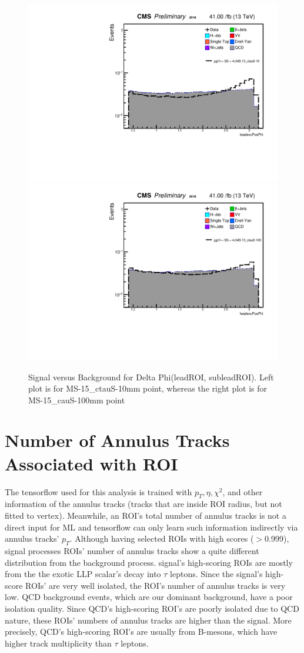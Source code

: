  \begin{figure}[h!]
   \caption{Signal versus Background for Delta Phi(leadROI, subleadROI). Left plot is for MS-15\_ctauS-10mm point, whereas the right plot is for MS-15\_cauS-100mm point}
   \label{fig:leadexcPosPhi}
   \centering
   \includegraphics[width=0.47\linewidth]{figs/AnalysisNoteplot_MS-15_ctauS-10_leadexcPosPhi.pdf}
   \includegraphics[width=0.47\linewidth]{figs/AnalysisNoteplot_MS-15_ctauS-100_leadexcPosPhi.pdf}
 \end{figure}








\section{Number of Annulus Tracks Associated with ROI}\label{ref:NumAnnulus}
 The tensorflow used for this analysis is trained with $p_T, \eta, \chi^{2}$, and other information of the annulus tracks (tracks that are inside ROI radius, but not fitted to vertex).
Meanwhile, an ROI's total number of annulus tracks is not a direct input for ML and tensorflow can only learn such information indirectly via annulus tracks' $p_T$.
Although having selected ROIs with high scores ($>$0.999), signal processes ROIs' number of annulus tracks show a quite different distribution from the background process.
signal's high-scoring ROIs are mostly from the the exotic LLP scalar's decay into $\tau$ leptons. 
Since the signal's high-score ROIs' are very well isolated, the ROI's number of annulus tracks is very low.
QCD background events, which are our dominant background, have a poor isolation quality.
Since QCD's high-scoring ROI's are poorly isolated due to QCD nature, these ROIs' numbers of annulus tracks are higher than the signal.
More precisely, QCD's high-scoring ROI's are usually from B-mesons, which have higher track multiplicity than $\tau$ leptons.


